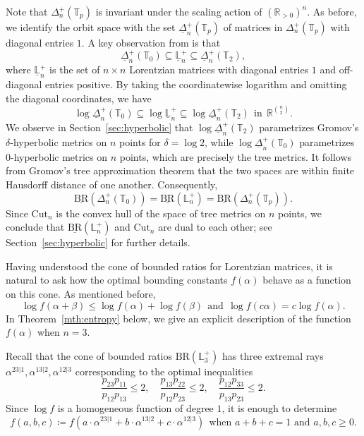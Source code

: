 \documentclass{amsart}
\theoremstyle{definition}
\theoremstyle{remark}
\def\RR{\mathbb{R}}
\def\T{\mathbb{T}}
\def\L{\mathbb{L}}
\def\BR{\mathrm{BR}}
\def\Cut{\mathrm{Cut}}
\begin{document}
Note that $\Delta^+_n(\T_p)$ is invariant under the scaling action of $(\RR_{>0})^n$. As before, we identify the orbit space with the set $\underline{\Delta}^+_n(\T_p)$ of matrices in $\Delta^+_n(\T_p)$ with diagonal entries $1$.
A key observation from \cite{BHKL-triangular} is that 
\[
 \underline{\Delta}_n^+(\T_0)\subseteq  \underline{\L}_n^+\subseteq  \underline{\Delta}_n^+(\T_2),
\]
where $\underline{\L}_n^+$ is the set of $n \times n$  Lorentzian matrices with diagonal entries $1$ and off-diagonal entries positive.
By taking the coordinatewise logarithm and omitting the diagonal coordinates, we have
\[
 \log \underline{\Delta}_n^+(\T_0)\subseteq  \log \underline{\L}_n^+\subseteq  \log \underline{\Delta}_n^+(\T_2) \ \ \text{in} \ \  \RR^{\binom{n}{2}}.
\]
We observe in Section~\ref{sec:hyperbolic} that  $\log \underline{\Delta}_n^+(\T_2)$ parametrizes Gromov's $\delta$-hyperbolic metrics on $n$ points for $\delta= \log 2$, while $ \log \underline{\Delta}_n^+(\T_0)$ parametrizes $0$-hyperbolic metrics on $n$ points, which are precisely the tree metrics. It follows from Gromov's tree approximation theorem \cite[Section 6.1]{Gromov} 
that the two spaces %
are within finite Hausdorff distance of one another. Consequently, 
\[
\underline{\BR}(\Delta_n^+(\T_0))=\underline{\BR}(\L_n^+)=\underline{\BR}(\Delta_n^+(\T_p)).
\]
Since $\Cut_n$ is the convex hull of the space of tree metrics on $n$ points, we conclude that $\underline{\BR}(\L_n^+)$ and $\Cut_n$ are dual to each other; see Section~\ref{sec:hyperbolic} for further details.



Having understood the cone of bounded ratios for Lorentzian matrices, it is natural  to ask how the optimal bounding constants $f(\alpha)$ behave as a function on this cone. As mentioned before,
\[
\log f(\alpha+\beta) \le \log f(\alpha)+\log f(\beta) \ \ \text{and} \ \ \log f(c \alpha) = c \log f(\alpha).
\]
In Theorem~\ref{mth:entropy} below, we give an explicit description of the  function $f(\alpha)$ when $n=3$.

Recall that the cone of bounded ratios $\BR(\L_3^+)$ has three extremal rays 
$
\alpha^{23|1}, \alpha^{13|2}, \alpha^{12|3}
$
corresponding to the optimal inequalities
\[
\frac{p_{23}p_{11}}{p_{12}p_{13}} \le 2, \quad \frac{p_{13}p_{22}}{p_{12}p_{23}} \le 2,
\quad \frac{p_{12}p_{33}}{p_{13}p_{23}} \le 2.
\]
Since $\log f$ is a homogeneous function of degree $1$, it is enough to determine 
\[
f(a,b,c)\coloneq f(a \cdot \alpha^{23|1}+b \cdot \alpha^{13|2}+ c \cdot \alpha^{12|3}) \ \ \text{when  $a+b+c=1$ and $a,b,c \ge 0$.}
\]
\end{document}
